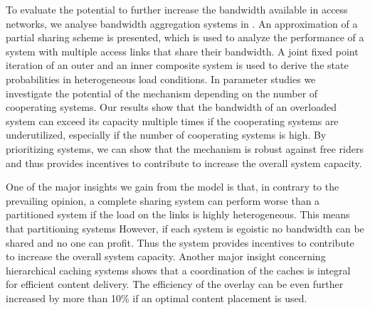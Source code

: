 To evaluate the potential to further increase the bandwidth available in access networks, we analyse bandwidth aggregation systems in .
An approximation of a partial sharing scheme is presented, which is used to analyze the performance of a system with multiple access links that share their bandwidth.
A joint fixed point iteration of an outer and an inner composite system is used to derive the state probabilities in heterogeneous load conditions.
In parameter studies we investigate the potential of the mechanism depending on the number of cooperating systems.
Our results show that the bandwidth of an overloaded system can exceed its capacity multiple times if the cooperating systems are underutilized, especially if the number of cooperating systems is high.
By prioritizing systems, we can show that the mechanism is robust against free riders and thus provides incentives to contribute to increase the overall system capacity.

One of the major insights we gain from the model is that, in contrary to the prevailing opinion, a complete sharing system can perform worse than a partitioned system if the load on the links is highly heterogeneous.
This means that partitioning systems
However, if each system is egoistic no bandwidth can be shared and no one can profit.
Thus the system provides incentives to contribute to increase the overall system capacity.
Another major insight concerning hierarchical caching systems shows that a coordination of the caches is integral for efficient content delivery.
The efficiency of the overlay can be even further increased by more than 10\% if an optimal content placement is used.

